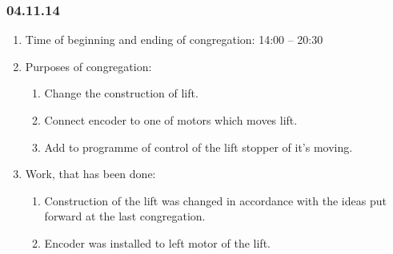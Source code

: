 
\subsubsection{04.11.14}

\begin{enumerate}
	\item Time of beginning and ending of congregation:
	14:00 – 20:30
	\item Purposes of congregation:
	\begin{enumerate}
	  \item Change the construction of lift.
	  
	  \item Connect encoder to one of motors which moves lift.
	  
	  \item Add to programme of control of the lift stopper of it's moving.
	  
    \end{enumerate}
    
	\item Work, that has been done:
	\begin{enumerate}
	  \item Construction of the lift was changed in accordance with the ideas put forward at the last congregation.
      
      \item Encoder was installed to left motor of the lift.
      

\end{enumerate}
\end{enumerate}

